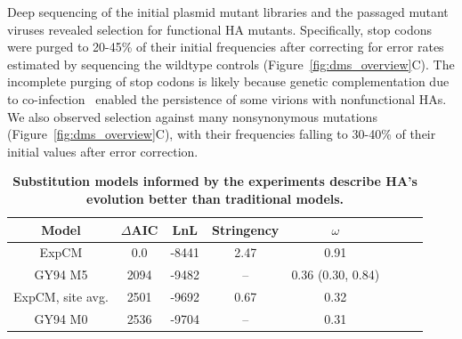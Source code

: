 \documentclass[9pt,twocolumn,twoside]{pnas-new}
\providecommand{\DIFaddbeginFL}{} %
\providecommand{\DIFaddendFL}{} %
\providecommand{\DIFdelbeginFL}{} %
\providecommand{\DIFdelendFL}{} %
\begin{document}
Deep sequencing of the initial plasmid mutant libraries and the passaged mutant viruses revealed selection for functional HA mutants.
Specifically, stop codons were purged to 20-45\% of their initial frequencies after correcting for error rates estimated by sequencing the wildtype controls (Figure~\ref{fig:dms_overview}C).
The incomplete purging of stop codons is likely because genetic complementation due to co-infection~\cite{marshall2013influenza, brooke2013most} enabled the persistence of some virions with nonfunctional HAs.
We also observed selection against many nonsynonymous mutations (Figure~\ref{fig:dms_overview}C), with their frequencies falling to 30-40\% of their initial values after error correction.

\begin{table}[b!]
\caption{\label{tab:phydms}
{\bf Substitution models informed by the experiments describe HA's evolution better than traditional models.}}
\begin{center}
\begin{tabular}{cccccccc}
\hline
\bf{Model} & \bf{$\Delta$AIC} & \bf{LnL} & \bf{Stringency} & \bf{$\omega$}  \\ \hline
ExpCM & 0.0 & -8441 & 2.47 & 0.91 \\
GY94 M5 & 2094 & -9482 & -- & 0.36 (0.30, 0.84) \\
ExpCM, site avg. & 2501 & -9692 & 0.67 & 0.32 \\
GY94 M0 & 2536 & -9704 & -- & 0.31 \\
\hline
\end{tabular}
 \end{center}
\DIFdelbeginFL %
\DIFdelendFL \DIFaddbeginFL {}
\DIFaddendFL \end{table}
\end{document}
